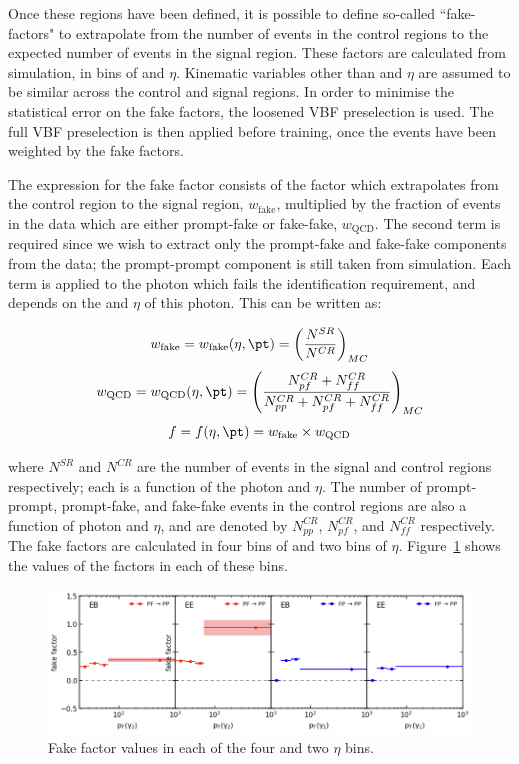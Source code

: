 Once these regions have been defined, it is possible to define so-called ``fake-factors" 
to extrapolate from the number of events in the control regions 
to the expected number of events in the signal region.
These factors are calculated from simulation, in bins of \pt and $\eta$.
Kinematic variables other than \pt and $\eta$ are assumed to be similar 
across the control and signal regions.
In order to minimise the statistical error on the fake factors, 
the loosened VBF preselection is used.
The full VBF preselection is then applied before training, 
once the events have been weighted by the fake factors.

The expression for the fake factor consists of the factor 
which extrapolates from the control region to the signal region, $w_{\textrm{fake}}$, 
multiplied by the fraction of events in the data which are either prompt-fake or fake-fake, 
$w_{\textrm{QCD}}$.
The second term is required since we wish to extract 
only the prompt-fake and fake-fake components from the data;
the prompt-prompt component is still taken from simulation.
Each term is applied to the photon which fails the identification requirement, 
and depends on the \pt and $\eta$ of this photon.
This can be written as:

\begin{equation*}
w_{\textrm{fake}} = w_{\textrm{fake}}(\eta,\pt)
= \left( \frac{N^{SR}} {N^{CR}} \right)_{MC}
\end{equation*}
\begin{equation*}
w_{\textrm{QCD}} = w_{\textrm{QCD}}(\eta,\pt)
= \left( \frac{N^{CR}_{pf} + N^{CR}_{ff}} {N^{CR}_{pp} + N^{CR}_{pf} + N^{CR}_{ff}} \right)_{MC}
\end{equation*}
\begin{equation*}
f = f(\eta,\pt) = w_{\textrm{fake}} \times w_{\textrm{QCD}}
\end{equation*}

where $N^{SR}$ and $N^{CR}$ are the number of events in the signal and control regions respectively;
each is a function of the photon \pt and $\eta$.
The number of prompt-prompt, prompt-fake, and fake-fake events in the control regions 
are also a function of photon \pt and $\eta$, 
and are denoted by $N^{CR}_{pp}$, $N^{CR}_{pf}$, and $N^{CR}_{ff}$ respectively.
The fake factors are calculated in four bins of \pt and two bins of $\eta$.
Figure~\ref{fig:cat_FakeFactors} shows the values of the factors in each of these bins.

\begin{figure}
  \centering
  \includegraphics[width=\textwidth]{Figures/Categorisation/fakeFactors.png}
  \caption{Fake factor values in each of the four \pt and two $\eta$ bins.}
  \label{fig:cat_FakeFactors}
\end{figure}

